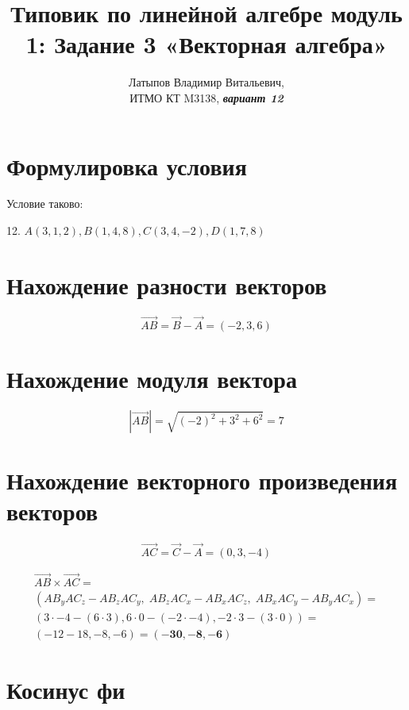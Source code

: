 \documentclass[12pt, a4paper]{article}
\author{Латыпов Владимир Витальевич, \\ ИТМО КТ M3138, \Huge{\textit{\textbf{вариант 12}}}}
\title{Типовик по линейной алгебре модуль 1: Задание 3 «Векторная алгебра»}
\begin{document}
    \tittoc

    \section{Формулировка условия}

    \begin{statement}
        Условие таково: 
        
        12. $A(3, 1, 2), B(1, 4, 8), C(3, 4, −2), D(1, 7, 8)$
    \end{statement}

    \section{Нахождение разности векторов}
    
    \begin{equation}
        \overrightarrow{AB} = \vec{B} - \vec{A} = (-2, 3, 6)
    \end{equation}
    
    \section{Нахождение модуля вектора}

    \begin{equation}
        |\overrightarrow{AB}| = \sqrt{(-2)^2 + 3^2 + 6^2} = 7
    \end{equation}
    
    \section{Нахождение векторного произведения векторов}

    \begin{equation}
        \overrightarrow{AC} = \vec{C} - \vec{A} = (0, 3, -4)
    \end{equation}

    \begin{multline}
        \overrightarrow{AB} \times \overrightarrow{AC} = \\ 
        (AB_{y}AC_{z}-AB_{z}AC_{y}, \; AB_{z}AC_{x}-AB_{x}AC_{z}, \; AB_{x}AC_{y}-AB_{y}AC_{x}) = \\
        (3 \cdot -4 - (6 \cdot 3), 6 \cdot 0 - (-2 \cdot -4), -2 \cdot 3 - (3 \cdot 0)) = \\
        (-12 - 18, -8, -6) = \symbf{(-30, -8, -6)}
    \end{multline}

    \section{Косинус фи}
\end{document}
